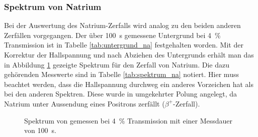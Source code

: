 \documentclass[11pt, a4paper]{article}
\numberwithin{equation}{section}
\begin{document}
\subsubsection{Spektrum von Natrium}
\begin{table}
	\centering
	
	\caption{Untergrundmessung für  mit einer Messdauer von \SI{100}{\second} bei \SI{4}{\percent} Transmission.}
	\label{tab:untergrund_na}
\end{table}
Bei der Auswertung des Natrium-Zerfalls wird analog zu den beiden anderen Zerfällen vorgegangen.
Der über \SI{100}{\second} gemessene Untergrund bei \SI{4}{\percent} Transmission ist in Tabelle \ref{tab:untergrund_na} festgehalten worden.
Mit der Korrektur der Hallspannung und nach Abziehen des Untergrunds erhält man das in Abbildung \ref{fig:natrium_spectrum} gezeigte Spektrum für den Zerfall von Natrium.
Die dazu gehörenden Messwerte sind in Tabelle \ref{tab:spektrum_na} notiert.
Hier muss beachtet werden, dass die Hallspannung durchweg ein anderes Vorzeichen hat als bei den anderen Spektren.
Diese wurde in umgekehrter Polung angelegt, da Natrium unter Aussendung eines Positrons zerfällt ($\beta^+$-Zerfall).
\begin{figure}[h]
	\centering
	
	\caption{Spektrum von  gemessen bei \SI{4}{\percent} Transmission mit einer Messdauer von \SI{100}{\second}.}
	\label{fig:natrium_spectrum}
\end{figure}
\end{document}
